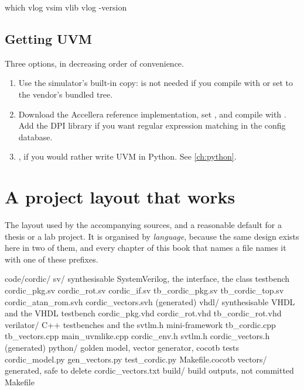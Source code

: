 \begin{shcode}
which vlog vsim vlib
vlog -version
\end{shcode}

\subsection{Getting UVM}

Three options, in decreasing order of convenience.

\begin{enumerate}
  \item Use the simulator's built-in copy: 
        is not needed if you compile with  or set
         to the vendor's bundled tree.
  \item Download the Accellera reference implementation, set
        , and compile  with
        . Add the DPI library if you want
        regular expression matching in the config database.
  \item {}, if you would rather write UVM in Python. See
        \cref{ch:python}.
\end{enumerate}

\section{A project layout that works}

The layout used by the accompanying sources, and a reasonable default for a
thesis or a lab project. It is organised by \emph{language}, because the same
design exists here in two of them, and every chapter of this book that names a
file names it with one of these prefixes.

\begin{txtcode}
code/cordic/
  sv/                     synthesisable SystemVerilog, the interface,
                          the class testbench
    cordic_pkg.sv  cordic_rot.sv  cordic_if.sv
    tb_cordic_pkg.sv  tb_cordic_top.sv
    cordic_atan_rom.svh  cordic_vectors.svh   (generated)
  vhdl/                   synthesisable VHDL and the VHDL testbench
    cordic_pkg.vhd  cordic_rot.vhd  tb_cordic_rot.vhd
  verilator/              C++ testbenches and the svtlm.h mini-framework
    tb_cordic.cpp  tb_vectors.cpp  main_uvmlike.cpp
    cordic_env.h  svtlm.h  cordic_vectors.h     (generated)
  python/                 golden model, vector generator, cocotb tests
    cordic_model.py  gen_vectors.py  test_cordic.py
    Makefile.cocotb
  vectors/                generated, safe to delete
    cordic_vectors.txt
  build/                  build outputs, not committed
  Makefile
\end{txtcode}

